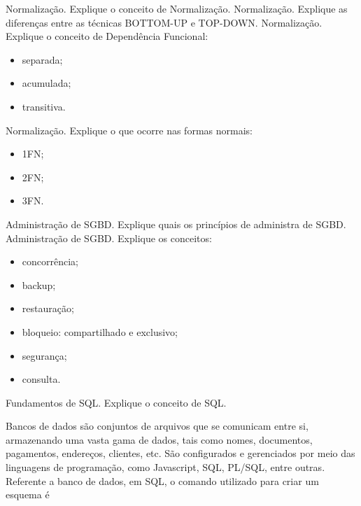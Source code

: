 \documentclass[12pt,answers]{exam}
\begin{document}
\begin{questions}
\question Normalização. Explique o conceito de Normalização.
\question Normalização. Explique as diferenças entre as técnicas BOTTOM-UP e TOP-DOWN.
\question Normalização. Explique o conceito de Dependência Funcional:
\begin{itemize}
    \item separada;
    \item acumulada;
    \item transitiva.
\end{itemize}
\question Normalização. Explique o que ocorre nas formas normais:
\begin{itemize}
    \item 1FN;
    \item 2FN;
    \item 3FN.
\end{itemize}

\question Administração de SGBD. Explique quais os princípios de administra de SGBD.
\question Administração de SGBD. Explique os conceitos:
\begin{itemize}
    \item concorrência;
    \item backup;
    \item restauração;
    \item bloqueio: compartilhado e exclusivo;
    \item segurança;
    \item consulta.
\end{itemize}
\question Fundamentos de SQL. Explique o conceito de SQL.

\question Bancos de dados são conjuntos de arquivos que se comunicam entre si, armazenando uma vasta gama de dados, tais como nomes, documentos, pagamentos, endereços, clientes, etc. São configurados e gerenciados por meio das linguagens de programação, como Javascript, SQL, PL/SQL, entre outras. Referente a banco de dados, em SQL, o comando utilizado para criar um esquema é

\end{questions}
\end{document}
